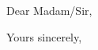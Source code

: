 \documentclass{uuletter}
\date{}
\begin{document}
\opening{Dear Madam/Sir,}

\lipsum

\closing[prof. dr. A.B.C. Zonnebloem]{Yours sincerely,}
\end{document}
